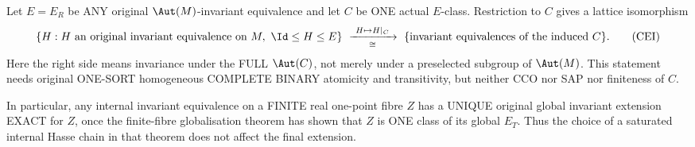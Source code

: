\begin{lemma}
\label{lem:rh-invariant-class-interval}
Let $E=E_R$ be ANY original
$\Aut(M)$-invariant equivalence
and let $C$ be ONE actual
$E$-class. Restriction to $C$
gives a lattice isomorphism
\[
 \{H:H\text{ an original
 invariant equivalence on }M,\
                 \Id\le H\le E\}
 \ \xrightarrow[\ \cong\ ]{\ H\mapsto H|_C\ }\
 \{\text{invariant equivalences
                    of the induced }C\}.
 \tag{CEI}\label{eq:rh-class-interval}
\]
Here the right side means
invariance under the FULL
$\Aut(C)$, not merely under a
preselected subgroup of
$\Aut(M)$.
This statement needs original
ONE-SORT homogeneous COMPLETE
BINARY atomicity and
transitivity, but neither CCO
nor SAP nor finiteness of $C$.

In particular, any internal
invariant equivalence on a
FINITE real one-point fibre $Z$
has a UNIQUE original global
invariant extension EXACT for
$Z$, once the finite-fibre
globalisation theorem has shown
that $Z$ is ONE class of its
global $E_T$. Thus the choice
of a saturated internal Hasse
chain in that theorem does not
affect the final extension.
\end{lemma}
